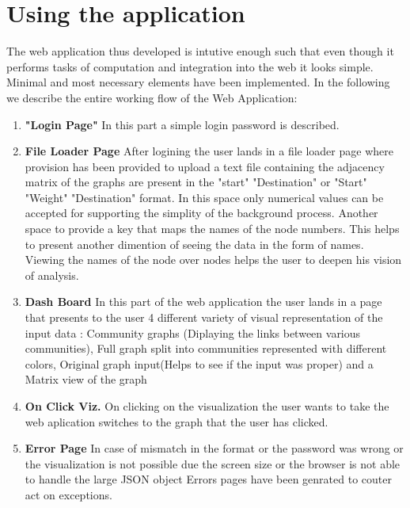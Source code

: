 \section{Using the application}
The web application thus developed is intutive enough such that even though it performs tasks of computation and integration into the web it looks simple. Minimal and most necessary elements have been implemented.
In the following we describe the entire working flow of the Web Application:
\begin{enumerate}
\item \textbf{"Login Page"} In this part a simple login password is described.  
\item \textbf{File Loader Page} After logining the user lands in a file loader page where provision has been provided to upload a text file containing the adjacency matrix of the graphs are present in the "start" "Destination" or "Start" "Weight" "Destination" format. In this space only numerical values can be accepted for supporting the simplity of the background process. Another space to provide a key that maps the names of the node numbers. This helps to present another dimention of seeing the data in the form of names.  Viewing the names of the node over nodes helps the user to deepen his vision of analysis. 
\item \textbf{Dash Board} In this part of the web application the user lands in a page that presents to the user 4 different variety of visual representation of the input data :  Community graphs (Diplaying the links between various communities), Full graph split into communities represented with different colors, Original graph input(Helps to see if the input was proper) and a Matrix view of the graph
\item \textbf{On Click Viz.} On clicking on the visualization the user wants to take the web aplication switches to the graph that the user has clicked.
\item \textbf{Error Page} In case of mismatch in the format or the password was wrong or the visualization is not possible due the screen size or the browser is not able to handle the large JSON object Errors pages have been genrated to couter act on exceptions. 
\end{enumerate}
